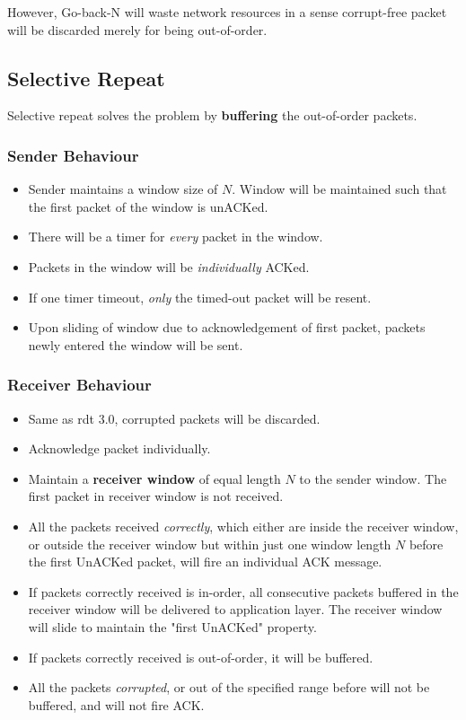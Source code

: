 \documentclass[12pt]{article}
\theoremstyle{definition}
\begin{document}
However, Go-back-N will waste network resources in a sense corrupt-free packet will be discarded merely for being out-of-order. 
\subsection{Selective Repeat}
Selective repeat solves the problem by \textbf{buffering} the out-of-order packets.
\subsubsection{Sender Behaviour}
\begin{itemize}
\item Sender maintains a window size of $N$. Window will be maintained such that the first packet of the window is unACKed.
\item There will be a timer for \textit{every} packet in the window.
\item Packets in the window will be \textit{individually} ACKed.
\item If one timer timeout, \textit{only} the timed-out packet will be resent.
\item Upon sliding of window due to acknowledgement of first packet, packets newly entered the window will be sent.
\end{itemize}
\subsubsection{Receiver Behaviour}
\begin{itemize}
  \item Same as rdt 3.0, corrupted packets will be discarded.
  \item Acknowledge packet individually.
  \item Maintain a \textbf{receiver window} of equal length $N$ to the sender window. The first packet in receiver window is not received.
  \item All the packets received \textit{correctly}, which either are inside the receiver window, or outside the receiver window but within just one window length $N$ before the first UnACKed packet, will fire an individual ACK message.
  \item If packets correctly received is in-order, all consecutive packets buffered in the receiver window will be delivered to application layer. The receiver window will slide to maintain the "first UnACKed" property.
  \item If packets correctly received is out-of-order, it will be buffered.
  \item All the packets \textit{corrupted}, or out of the specified range before will not be buffered, and will not fire ACK.
  \end{itemize}
  \clearpage
\end{document}
